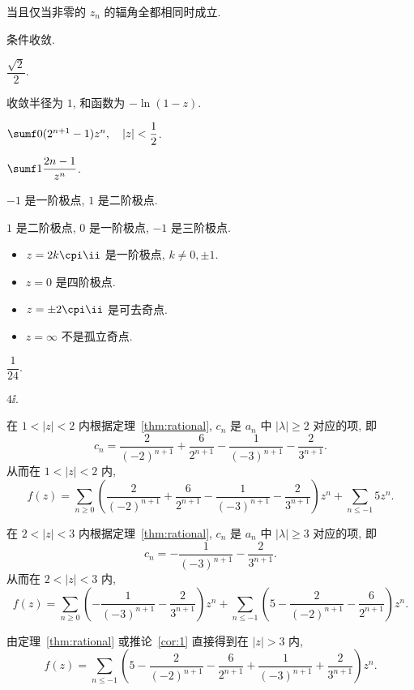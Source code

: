 \begin{multicols}{2}
\begin{exerciseanswer}
  \item 当且仅当非零的 $z_n$ 的辐角全都相同时成立.
  \item 条件收敛.
  \item $\dfrac{\sqrt2}2$.
  \item 收敛半径为 $1$, 和函数为 $-\ln(1-z)$.
  \item $\sumf0(2^{n+1}-1)z^n,\quad |z|<\dfrac12$.
  \item $\sumf1 \dfrac{2n-1}{z^n}$.
  \item $-1$ 是一阶极点, $1$ 是二阶极点.
  \item $1$ 是二阶极点, $0$ 是一阶极点, $-1$ 是三阶极点.
  \item \begin{itemize}
    \item $z=2k\cpi\ii $ 是一阶极点, $k\neq 0,\pm1$.
    \item $z=0$ 是四阶极点.
    \item $z=\pm 2\cpi\ii $ 是可去奇点.
    \item $z=\infty$ 不是孤立奇点.
  \end{itemize}
\end{exerciseanswer}

\begin{exerciseanswer}
  \item $\dfrac1{24}$.
  \item $4\ii$.
\end{exerciseanswer}




\begin{solution}
  \begin{enuma}
    \item 在 $1<|z|<2$ 内根据定理~\ref{thm:rational}, $c_n$ 是 $a_n$ 中 $|\lambda|\ge 2$ 对应的项, 即
  \[c_n=\frac2{(-2)^{n+1}}+\frac6{2^{n+1}}-\frac1{(-3)^{n+1}}-\frac2{3^{n+1}}.\]
  从而在 $1<|z|<2$ 内, 
  \[f(z)=\sum_{n\ge 0}\left(\frac2{(-2)^{n+1}}+\frac6{2^{n+1}}-\frac1{(-3)^{n+1}}-\frac2{3^{n+1}}\right)z^n+\sum_{n\le-1}5z^n.\]
      \item 在 $2<|z|<3$ 内根据定理~\ref{thm:rational}, $c_n$ 是 $a_n$ 中 $|\lambda|\ge 3$ 对应的项, 即
  \[c_n=-\frac1{(-3)^{n+1}}-\frac2{3^{n+1}}.\]
  从而在 $2<|z|<3$ 内, 
  \[f(z)=\sum_{n\ge 0}\left(-\frac1{(-3)^{n+1}}-\frac2{3^{n+1}}\right)z^n+\sum_{n\le-1}\left(5-\frac2{(-2)^{n+1}}-\frac6{2^{n+1}}\right)z^n.\]
    \item 由定理~\ref{thm:rational} 或推论~\ref{cor:1} 直接得到在 $|z|>3$ 内, 
  \[f(z)=\sum_{n\le-1}\left(5-\frac2{(-2)^{n+1}}-\frac6{2^{n+1}}+\frac1{(-3)^{n+1}}+\frac2{3^{n+1}}\right)z^n.\]    
  \end{enuma}
\end{solution}
  
\end{multicols}